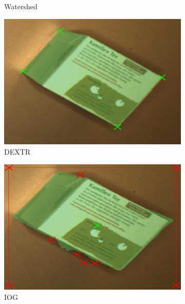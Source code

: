 \begin{figure}
\begin{subfigure}[t]{0.3\textwidth}
		\caption{
			Watershed
		}
	\end{subfigure}
	\hfill
	\begin{subfigure}[t]{0.3\textwidth}
		\centering
		\includegraphics[width=\textwidth]{figures/appendix/method_predictions/tea17_dextr.png}
		\caption{
			DEXTR
		}
	\end{subfigure}
	\hfill
	\begin{subfigure}[t]{0.3\textwidth}
		\centering
		\includegraphics[width=\textwidth]{figures/appendix/method_predictions/tea17_iog.png}
		\caption{
			IOG
		}
	\end{subfigure}
	\\
	\begin{subfigure}[t]{0.3\textwidth}
		\centering

\end{subfigure}
\end{figure}

